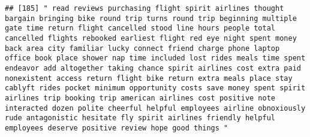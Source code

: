 \documentclass[
]{article}
\begin{document}
\begin{verbatim}
## [185] " read reviews purchasing flight spirit airlines thought bargain bringing bike round trip turns round trip beginning multiple gate time return flight cancelled stood line hours people total cancelled flights rebooked earliest flight red eye night spent money back area city familiar lucky connect friend charge phone laptop office book place shower nap time included lost rides meals time spent endeavor add altogether taking chance spirit airlines cost extra paid nonexistent access return flight bike return extra meals place stay cablyft rides pocket minimum opportunity costs save money spent spirit airlines trip booking trip american airlines cost positive note interacted dozen polite cheerful helpful employees airline obnoxiously rude antagonistic hesitate fly spirit airlines friendly helpful employees deserve positive review hope good things "                                                                                                                                                                                                                                                                                                                                                                                                                                                                                                                                                                                                                                                                                                                                                                                                                                                                                                         

\end{verbatim}
\end{document}
